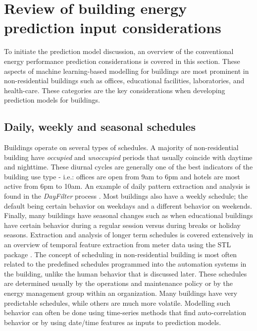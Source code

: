 \documentclass[preprint,12pt]{elsarticle}
\begin{document}
\section{Review of building energy prediction input considerations}
\label{sec:modelling_considerations}

To initiate the prediction model discussion, an overview of the conventional energy performance prediction considerations is covered in this section. These aspects of machine learning-based modelling for buildings are most prominent in non-residential buildings such as offices, educational facilities, laboratories, and health-care. These categories are the key considerations when developing prediction models for buildings.

\subsection{Daily, weekly and seasonal schedules}
\label{sec:schedules}
Buildings operate on several types of schedules. A majority of non-residential building have \emph{occupied} and \emph{unoccupied} periods that usually coincide with daytime and nighttime. These diurnal cycles are generally one of the best indicators of the building use type - i.e.: offices are open from 9am to 6pm and hotels are most active from 6pm to 10am. An example of daily pattern extraction and analysis is found in the \emph{DayFilter} process \cite{Miller2015AutomatedData}. Most buildings also have a weekly schedule; the default being certain behavior on weekdays and a different behavior on weekends. Finally, many buildings have seasonal changes such as when educational buildings have certain behavior during a regular session versus during breaks or holiday seasons. Extraction and analysis of longer term schedules is covered extensively in an overview of temporal feature extraction from meter data using the STL package \cite{Miller2017MiningBuildings,Cleveland1990STL:Statistics}. The concept of scheduling in non-residential building is most often related to the predefined schedules programmed into the automation systems in the building, unlike the human behavior that is discussed later. These schedules are determined usually by the operations and maintenance policy or by the energy management group within an organization. Many buildings have very predictable schedules, while others are much more volatile. Modelling such behavior can often be done using time-series methods that find auto-correlation behavior or by using date/time features as inputs to prediction models.
\end{document}
